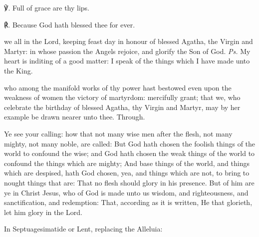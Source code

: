 ℣. Full of grace are thy lips.

℟. Because God hath blessed thee for ever.


\introit
{} we all in the Lord, keeping feast day in honour of blessed Agatha, the Virgin and Martyr: in whose passion the Angels rejoice, and glorify the Son of God. \textit{Ps.} My heart is inditing of a good matter: I speak of the things which I have made unto the King.

\collect
{} who among the manifold works of thy power hast bestowed even upon the weakness of women the victory of martyrdom: mercifully grant; that we, who celebrate the birthday of blessed Agatha, thy Virgin and Martyr, may by her example be drawn nearer unto thee. Through.

 Ye see your calling: how that not many wise men after the flesh, not many mighty, not many noble, are called: But God hath chosen the foolish things of the world to confound the wise; and God hath chosen the weak things of the world to confound the things which are mighty; And base things of the world, and things which are despised, hath God chosen, yea, and things which are not, to bring to nought things that are: That no flesh should glory in his presence. But of him are ye in Christ Jesus, who of God is made unto us wisdom, and righteousness, and sanctification, and redemption: That, according as it is written, He that glorieth, let him glory in the Lord.


\begin{rubric}
{In Septuagesimatide or Lent, replacing the Alleluia:}
\end{rubric}\par\noindent
{}

